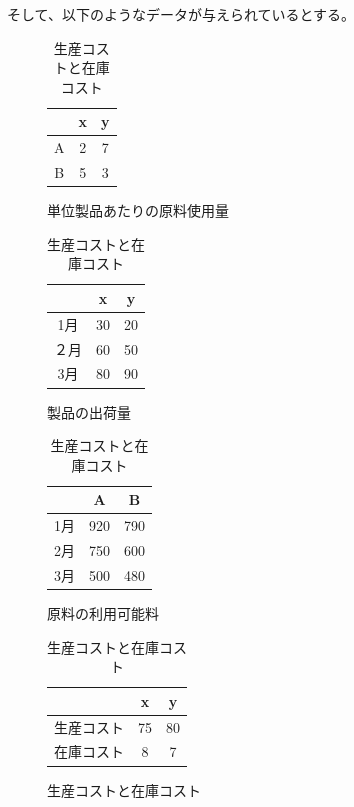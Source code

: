 \documentclass[9pt]{ltjsreport}
\begin{document}
そして、以下のようなデータが与えられているとする。
\begin{table}[h]
    \centering
    \label{tab:manySpan}
    \caption{多期間計画問題のデータ}
    \begin{subfigure}{0.2\columnwidth}
        \centering
        \caption[(a)]{単位製品あたりの原料使用量}
        \begin{tabular}{ccc}\toprule
             &x&y\\ \midrule
            A&2&7\\
            B&5&3 \\ \bottomrule
        \end{tabular}
    \end{subfigure}
    \begin{subfigure}{0.2\columnwidth}
        \centering
        \caption[(b)]{製品の出荷量}
        \begin{tabular}{ccc}\toprule
             &x&y\\ \midrule
            1月&30&20\\
            ２月&60&50 \\
            3月&80&90\\ \bottomrule
        \end{tabular}
    \end{subfigure}
    \begin{subfigure}{0.2\columnwidth}
        \centering
        \caption[(c)]{原料の利用可能料}
        \begin{tabular}{ccc}\toprule
             &A&B\\ \midrule
            1月&920&790\\
            2月&750&600 \\
            3月&500&480 \\ \bottomrule
        \end{tabular}
    \end{subfigure}
    \begin{subfigure}{0.2\columnwidth}
        \centering
        \caption[(d)]{生産コストと在庫コスト}
        \begin{tabular}{ccc}\toprule
             &x&y\\ \midrule
            生産コスト&75&80\\
            在庫コスト&8&7 \\ \bottomrule
        \end{tabular}
    \end{subfigure}

\end{table}
\end{document}
